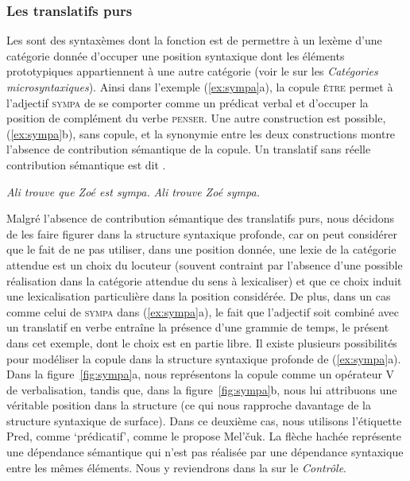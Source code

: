 \subsubsection{Les translatifs purs}\largerpage
Les  sont des syntaxèmes dont la fonction est de permettre à un lexème d’une catégorie donnée d’occuper une position syntaxique dont les éléments prototypiques appartiennent à une autre catégorie (voir le  sur les \textit{Catégories microsyntaxiques}). Ainsi dans l’exemple (\ref{ex:sympa}a), la copule \textsc{être} permet à l’adjectif \textsc{sympa} de se comporter comme un prédicat verbal et d’occuper la position de complément du verbe \textsc{penser}. Une autre construction est possible, (\ref{ex:sympa}b), sans copule, et la synonymie entre les deux constructions montre l’absence de contribution sémantique de la copule. Un translatif sans réelle contribution sémantique est dit .

\ea\label{ex:sympa}
    \ea \textit{Ali trouve que Zoé est sympa.}
\ex \textit{Ali trouve Zoé sympa.}\z\z

Malgré l’absence de contribution sémantique des translatifs purs, nous décidons de les faire figurer dans la structure syntaxique profonde, car on peut considérer que le fait de ne pas utiliser, dans une position donnée, une lexie de la catégorie attendue est un choix du locuteur (souvent contraint par l’absence d’une possible réalisation dans la catégorie attendue du sens à lexicaliser) et que ce choix induit une lexicalisation particulière dans la position considérée. De plus, dans un cas comme celui de \textsc{sympa} dans (\ref{ex:sympa}a), le fait que l’adjectif soit combiné avec un translatif en verbe entraîne la présence d’une grammie de temps, le présent dans cet exemple, dont le choix est en partie libre. 
Il existe plusieurs possibilités pour modéliser la copule dans la structure syntaxique profonde de (\ref{ex:sympa}a). Dans la figure~\ref{fig:sympa}a, nous représentons la copule comme un opérateur V de verbalisation, tandis que, dans la figure~\ref{fig:sympa}b, nous lui attribuons une véritable position dans la structure (ce qui nous rapproche davantage de la structure syntaxique de surface). Dans ce deuxième cas, nous utilisons l’étiquette Pred, comme ‘prédicatif’, comme le propose Mel’čuk. La flèche hachée représente une dépendance sémantique qui n’est pas réalisée par une dépendance syntaxique entre les mêmes éléments. Nous y reviendrons dans la  sur le \textit{Contrôle}.

